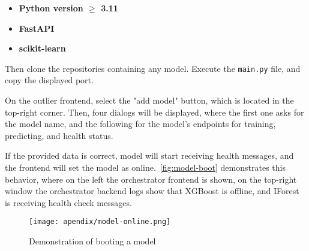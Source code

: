\begin{itemize}
    \item \textbf{Python version $\geq$ 3.11}
    \item \textbf{FastAPI}
    \item \textbf{scikit-learn}
\end{itemize}

Then clone the repositories containing any model. Execute the \texttt{main.py} file, and copy the displayed port.

On the outlier frontend, select the "add model" button, which is located in the top-right corner. Then, four dialogs will be displayed, where the first one asks for the model name, and the following for the model's endpoints for training, predicting, and health status.

If the provided data is correct, model will start receiving health messages, and the frontend will set the model as online.\ \autoref{fig:model-boot} demonstrates this behavior, where on the left the orchestrator frontend is shown, on the top-right window the orchestrator backend logs show that XGBoost is offline, and \ac{IForest} is receiving health check messages.

\begin{figure}[H]
    \centering
    \texttt{[image: apendix/model-online.png]}
    \caption{Demonstration of booting a model}
    \label{fig:model-boot}
\end{figure}
